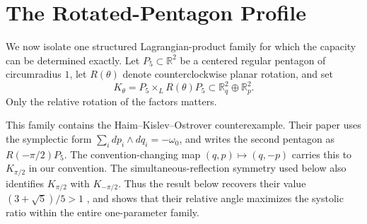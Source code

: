 \section{The Rotated-Pentagon Profile}
\label{sec:rotated-regular-polygons}

We now isolate one structured Lagrangian-product family for which the capacity
can be determined exactly.  Let \(P_5\subset\mathbb R^2\) be a centered regular
pentagon of circumradius \(1\), let \(R(\theta)\) denote counterclockwise planar
rotation, and set
\[
  K_\theta=P_5\times_L R(\theta)P_5
  \subset \mathbb R^2_q\oplus\mathbb R^2_p.
\]
Only the relative rotation of the factors matters.

This family contains the Haim--Kislev--Ostrover counterexample.  Their paper
uses the symplectic form \(\sum_i dp_i\wedge dq_i=-\omega_0\), and writes the
second pentagon as \(R(-\pi/2)P_5\).  The convention-changing map
\((q,p)\mapsto(q,-p)\) carries this to \(K_{\pi/2}\) in our convention.  The
simultaneous-reflection symmetry used below also identifies \(K_{\pi/2}\) with
\(K_{-\pi/2}\).  Thus the result below recovers their value
\((3+\sqrt5)/5>1\) \cite[Proposition~1.4]{HaimKislevOstrover2024}, and shows
that their relative angle maximizes the systolic ratio within the entire
one-parameter family.





